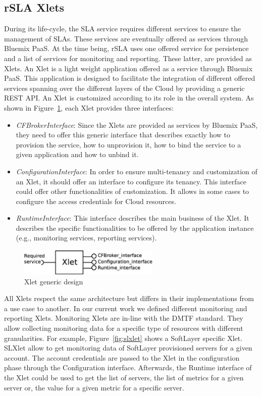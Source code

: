 \subsection{rSLA Xlets}
During its life-cycle, the SLA service requires different services to ensure the management of SLAs. These services are eventually offered as services through Bluemix PaaS. At the 
time being, rSLA uses one offered service for persistence and a list of services for monitoring and reporting. These latter, are provided as Xlets. An Xlet is a light weight 
application offered as a service through Bluemix PaaS. This application is designed to facilitate the integration of different offered services spanning over the different layers 
of the Cloud by providing a generic REST API. An Xlet is customized according to its role in the overall system. As shown in Figure~\ref{fig:xlet}, each Xlet provides three 
interfaces:
\begin{itemize}
 \item \emph{CFBrokerInterface}: Since the Xlets are provided as services by Bluemix PaaS, they need to offer this generic interface that describes exactly how to provision the 
service, how to unprovision it, how to bind the service to a given application and how to unbind it. 
\item  \emph{ConfigurationInterface}: In order to ensure multi-tenancy and customization of an Xlet, it should offer an interface to configure its tenancy. This interface could 
offer other functionalities of customization. It allows in some cases to configure the access credentials for Cloud resources.
\item  \emph{RuntimeInterface}: This interface describes the main business of the Xlet. It describes the specific functionalities to be offered by the application instance (e.g., 
monitoring services, reporting services). 
\end{itemize}
\begin{figure}[H]
\centering
\includegraphics[width=0.6\textwidth]{pics/Xlet}
\caption{\label{fig:xlet} Xlet generic design}
\end{figure}

All Xlets respect the same architecture but differs in their implementations from a use case to another. In our current work we defined different monitoring and reporting Xlets. 
Monitoring Xlets are in-line with the DMTF standard. They allow collecting monitoring data for a specific type of resources with different granularities. For example, 
Figure~\ref{fig:slxlet} shows a SoftLayer specific Xlet. SLXlet allow to get monitoring data of SoftLayer provisioned servers for a given account. The account credentials are 
passed to the Xlet in the configuration phase through the Configuration interface. Afterwards, the Runtime interface of the Xlet could be used to get the list of servers, the list 
of metrics for a given server or, the value for a given metric for a specific server.

